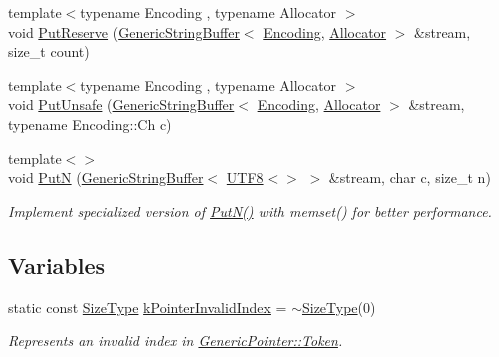 \begin{DoxyCompactItemize}
{\footnotesize template$<$typename Encoding , typename Allocator $>$ }\\void \mbox{\hyperlink{namespacerapidjson_ab38d4a353d3577fdedd8171316af80b3}{Put\+Reserve}} (\mbox{\hyperlink{classrapidjson_1_1_generic_string_buffer}{Generic\+String\+Buffer}}$<$ \mbox{\hyperlink{classrapidjson_1_1_encoding}{Encoding}}, \mbox{\hyperlink{classrapidjson_1_1_allocator}{Allocator}} $>$ \&stream, size\+\_\+t count)
\item 
{\footnotesize template$<$typename Encoding , typename Allocator $>$ }\\void \mbox{\hyperlink{namespacerapidjson_ad338901177ac5feb414a9e620bfbd717}{Put\+Unsafe}} (\mbox{\hyperlink{classrapidjson_1_1_generic_string_buffer}{Generic\+String\+Buffer}}$<$ \mbox{\hyperlink{classrapidjson_1_1_encoding}{Encoding}}, \mbox{\hyperlink{classrapidjson_1_1_allocator}{Allocator}} $>$ \&stream, typename Encoding\+::\+Ch c)
\item 
{\footnotesize template$<$$>$ }\\void \mbox{\hyperlink{namespacerapidjson_a9d43be9c033dc49738b713fe6fbafecf}{PutN}} (\mbox{\hyperlink{classrapidjson_1_1_generic_string_buffer}{Generic\+String\+Buffer}}$<$ \mbox{\hyperlink{structrapidjson_1_1_u_t_f8}{U\+T\+F8}}$<$$>$ $>$ \&stream, char c, size\+\_\+t n)
\begin{DoxyCompactList}\small\item\em Implement specialized version of \mbox{\hyperlink{namespacerapidjson_a1ac13bac5976fc06587e00fc0bcfb32a}{Put\+N()}} with memset() for better performance. \end{DoxyCompactList}\end{DoxyCompactItemize}
\subsection*{Variables}
\begin{DoxyCompactItemize}
\item 
static const \mbox{\hyperlink{namespacerapidjson_a44eb33eaa523e36d466b1ced64b85c84}{Size\+Type}} \mbox{\hyperlink{namespacerapidjson_a7c5fc5aced6a3cde477b80699a3f13d7}{k\+Pointer\+Invalid\+Index}} = $\sim$\mbox{\hyperlink{namespacerapidjson_a44eb33eaa523e36d466b1ced64b85c84}{Size\+Type}}(0)
\begin{DoxyCompactList}\small\item\em Represents an invalid index in \mbox{\hyperlink{structrapidjson_1_1_generic_pointer_1_1_token}{Generic\+Pointer\+::\+Token}}. \end{DoxyCompactList}\end{DoxyCompactItemize}
